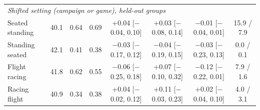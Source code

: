 \begin{table}[t]
\begin{tabular}{@{}lrcccccc@{}}
\multicolumn{8}{l}{\emph{Shifted setting (campaign or game), held-out groups}} \\
Seated \ra{} standing & 40.1 & 0.64 & 0.69 & +0.04 [$-$0.04, 0.10] & +0.03 [$-$0.08, 0.14] & $-$0.01 [$-$0.04, 0.01] & 15.9 / 7.9 \\
Standing \ra{} seated & 42.1 & 0.41 & 0.38 & $-$0.03 [$-$0.17, 0.12] & $-$0.04 [$-$0.19, 0.15] & $-$0.03 [$-$0.23, 0.13] & 0.0 / 0.1 \\
Flight \ra{} racing & 41.8 & 0.62 & 0.55 & $-$0.06 [$-$0.25, 0.18] & +0.07 [$-$0.10, 0.32] & $-$0.12 [$-$0.22, 0.01] & 7.9 / 1.6 \\
Racing \ra{} flight & 40.9 & 0.34 & 0.38 & +0.04 [$-$0.02, 0.12] & +0.11 [$-$0.03, 0.23] & +0.02 [$-$0.04, 0.10] & 4.0 / 3.1 \\
\bottomrule
\end{tabular}
\end{table}
